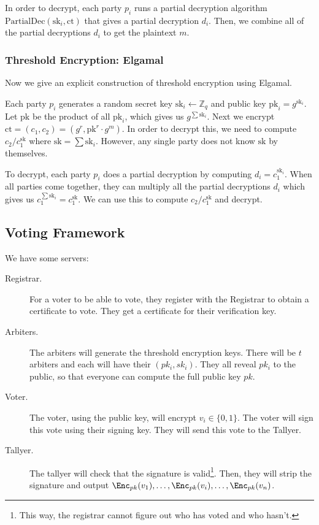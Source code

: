 In order to decrypt, each party $p_i$ runs a partial decryption algorithm $\text{PartialDec}(\text{sk}_i, \text{ct})$ that gives a partial decryption $d_i$. Then, we combine all of the partial decryptions $d_i$ to get the plaintext $m$.

\subsubsection{Threshold Encryption: Elgamal}

Now we give an explicit construction of threshold encryption using Elgamal.

Each party $p_i$ generates a random secret key $\text{sk}_i \gets \mathbb{Z}_q$ and public key $\text{pk}_i = g^{\text{sk}_i}$. Let $\text{pk}$ be the product of all $\text{pk}_i$, which gives us $g^{\sum \text{sk}_i}$. Next we encrypt $\text{ct} = (c_1, c_2) = (g^r, \text{pk}^r \cdot g^m)$. In order to decrypt this, we need to compute $c_2 / c_1^{\text{sk}}$ where $\text{sk} = \sum \text{sk}_i$. However, any single party does not know $\text{sk}$ by themselves.

To decrypt, each party $p_i$ does a partial decryption by computing $d_i = c_1^{\text{sk}_i}$. When all parties come together, they can multiply all the partial decryptions $d_i$ which gives us $c_1^{\sum \text{sk}_i} = c_1 ^\text{sk}$. We can use this to compute $c_2 / c_1^\text{sk}$ and decrypt.

\subsection{Voting Framework}
We have some servers:
\begin{description}
    \item[Registrar.] For a voter to be able to vote, they register with the Registrar to obtain a certificate to vote. They get a certificate for their verification key.
    \item[Arbiters.] The arbiters will generate the threshold encryption keys. There will be $t$ arbiters and each will have their $(pk_i, sk_i)$. They all reveal $pk_i$ to the public, so that everyone can compute the full public key $pk$.
    \item[Voter.] The voter, using the public key, will encrypt $v_i \in\{0, 1\}$. The voter will sign this vote using their signing key. They will send this vote to the Tallyer.
    \item[Tallyer.] The tallyer will check that the signature is valid\footnote{This way, the registrar cannot figure out who has voted and who hasn't.}. Then, they will strip the signature and output $\Enc_{pk}(v_1), \dots, \Enc_{pk}(v_i), \dots, \Enc_{pk}(v_n)$.
\end{description}

